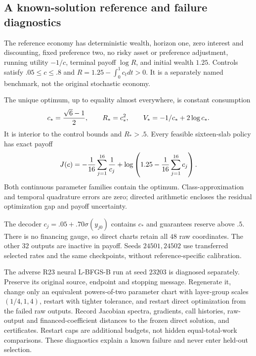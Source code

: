 \subsection{A known-solution reference and failure diagnostics}
The reference economy has deterministic wealth, horizon one, zero interest and discounting, fixed preference two, no risky asset or preference adjustment, running utility $-1/c$, terminal payoff $\log R$, and initial wealth $1.25$. Controls satisfy $.05\leq c\leq.8$ and $R=1.25-\int_0^1c_tdt>0$. It is a separately named benchmark, not the original stochastic economy.
\begin{proposition}\label{prop:r24reference}
The unique optimum, up to equality almost everywhere, is constant consumption
\[
 c_*={\sqrt6-1\over2},\qquad R_*=c_*^2,\qquad V_*=-1/c_*+2\log c_*.
\]
It is interior to the control bounds and $R_*>.5$. Every feasible sixteen-slab policy has exact payoff
\[
 J(c)=-{1\over16}\sum_{j=1}^{16}{1\over c_j}+\log\left(1.25-{1\over16}\sum_{j=1}^{16}c_j\right).
\]
Both continuous parameter families contain the optimum. Class-approximation and temporal quadrature errors are zero; directed arithmetic encloses the residual optimization gap and payoff uncertainty.
\end{proposition}
The decoder $c_j=.05+.70\sigma(y_{j0})$ contains $c_*$ and guarantees reserve above $.5$. There is no financing gauge, so direct charts retain all $48$ raw coordinates. The other $32$ outputs are inactive in payoff. Seeds $24501,24502$ use transferred selected rates and the same checkpoints, without reference-specific calibration.

The adverse R23 neural L-BFGS-B run at seed $23203$ is diagnosed separately. Preserve its original source, endpoint and stopping message. Regenerate it, change only an equivalent powers-of-two parameter chart with layer-group scales $(1/4,1,4)$, restart with tighter tolerance, and restart direct optimization from the failed raw outputs. Record Jacobian spectra, gradients, call histories, raw-output and financed-coefficient distances to the frozen direct solution, and certificates. Restart caps are additional budgets, not hidden equal-total-work comparisons. These diagnostics explain a known failure and never enter held-out selection.
